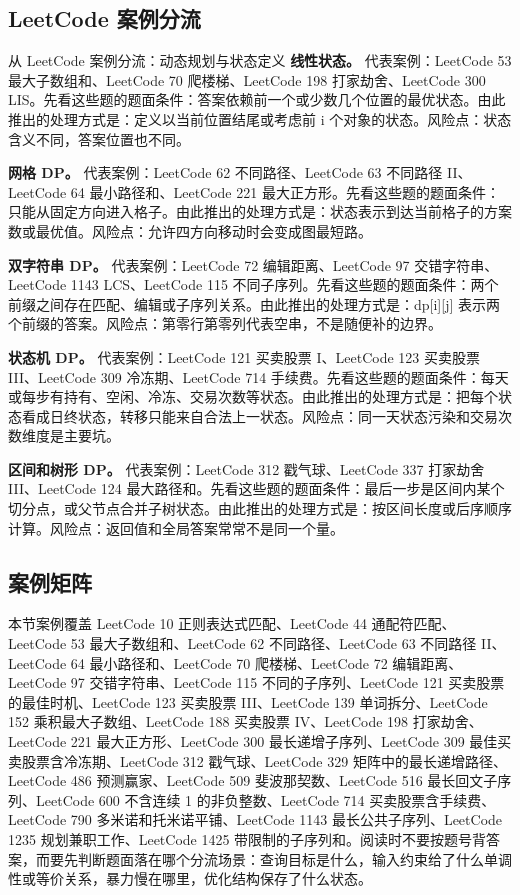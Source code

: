 \subsection{LeetCode 案例分流}

\begin{principlebox}{从 LeetCode 案例分流：动态规划与状态定义}
\textbf{线性状态。}
代表案例：LeetCode 53 最大子数组和、LeetCode 70 爬楼梯、LeetCode 198 打家劫舍、LeetCode 300 LIS。先看这些题的题面条件：答案依赖前一个或少数几个位置的最优状态。由此推出的处理方式是：定义以当前位置结尾或考虑前 i 个对象的状态。风险点：状态含义不同，答案位置也不同。

\textbf{网格 DP。}
代表案例：LeetCode 62 不同路径、LeetCode 63 不同路径 II、LeetCode 64 最小路径和、LeetCode 221 最大正方形。先看这些题的题面条件：只能从固定方向进入格子。由此推出的处理方式是：状态表示到达当前格子的方案数或最优值。风险点：允许四方向移动时会变成图最短路。

\textbf{双字符串 DP。}
代表案例：LeetCode 72 编辑距离、LeetCode 97 交错字符串、LeetCode 1143 LCS、LeetCode 115 不同子序列。先看这些题的题面条件：两个前缀之间存在匹配、编辑或子序列关系。由此推出的处理方式是：dp[i][j] 表示两个前缀的答案。风险点：第零行第零列代表空串，不是随便补的边界。

\textbf{状态机 DP。}
代表案例：LeetCode 121 买卖股票 I、LeetCode 123 买卖股票 III、LeetCode 309 冷冻期、LeetCode 714 手续费。先看这些题的题面条件：每天或每步有持有、空闲、冷冻、交易次数等状态。由此推出的处理方式是：把每个状态看成日终状态，转移只能来自合法上一状态。风险点：同一天状态污染和交易次数维度是主要坑。

\textbf{区间和树形 DP。}
代表案例：LeetCode 312 戳气球、LeetCode 337 打家劫舍 III、LeetCode 124 最大路径和。先看这些题的题面条件：最后一步是区间内某个切分点，或父节点合并子树状态。由此推出的处理方式是：按区间长度或后序顺序计算。风险点：返回值和全局答案常常不是同一个量。

\end{principlebox}

\subsection{案例矩阵}

本节案例覆盖 LeetCode 10 正则表达式匹配、LeetCode 44 通配符匹配、LeetCode 53 最大子数组和、LeetCode 62 不同路径、LeetCode 63 不同路径 II、LeetCode 64 最小路径和、LeetCode 70 爬楼梯、LeetCode 72 编辑距离、LeetCode 97 交错字符串、LeetCode 115 不同的子序列、LeetCode 121 买卖股票的最佳时机、LeetCode 123 买卖股票 III、LeetCode 139 单词拆分、LeetCode 152 乘积最大子数组、LeetCode 188 买卖股票 IV、LeetCode 198 打家劫舍、LeetCode 221 最大正方形、LeetCode 300 最长递增子序列、LeetCode 309 最佳买卖股票含冷冻期、LeetCode 312 戳气球、LeetCode 329 矩阵中的最长递增路径、LeetCode 486 预测赢家、LeetCode 509 斐波那契数、LeetCode 516 最长回文子序列、LeetCode 600 不含连续 1 的非负整数、LeetCode 714 买卖股票含手续费、LeetCode 790 多米诺和托米诺平铺、LeetCode 1143 最长公共子序列、LeetCode 1235 规划兼职工作、LeetCode 1425 带限制的子序列和。阅读时不要按题号背答案，而要先判断题面落在哪个分流场景：查询目标是什么，输入约束给了什么单调性或等价关系，暴力慢在哪里，优化结构保存了什么状态。

